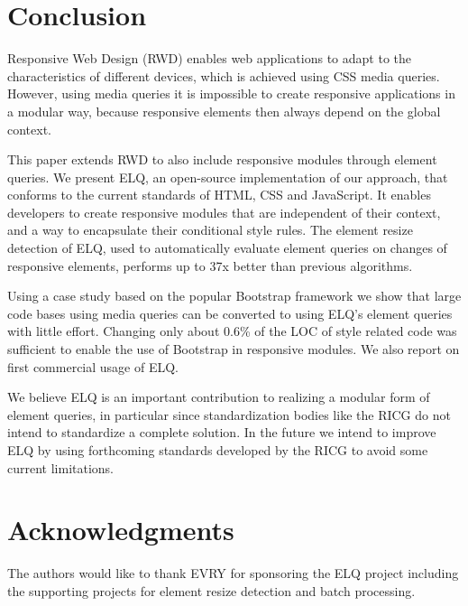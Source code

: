 \documentclass{acm_proc_article-sp}
\newcommand{\elq}{ELQ}
\begin{document}
\section{Conclusion}\label{sec:conclusion}

  Responsive Web Design (RWD) enables web applications to adapt to the characteristics of different devices, which is achieved using CSS media queries.
  However, using media queries it is impossible to create responsive applications in a modular way, because responsive elements then always depend on the global context.

  This paper extends RWD to also include responsive modules through element queries.
  We present \elq{}, an open-source implementation of our approach, that conforms to the current standards of HTML, CSS and JavaScript.
  It enables developers to create responsive modules that are independent of their context, and a way to encapsulate their conditional style rules.
  The element resize detection of \elq{}, used to automatically evaluate element queries on changes of responsive elements, performs up to 37x better than previous algorithms.

  Using a case study based on the popular Bootstrap framework we show that large code bases using media queries can be converted to using \elq{}'s element queries with little effort.
  Changing only about 0.6\% of the LOC of style related code was sufficient to enable the use of Bootstrap in responsive modules.
  We also report on first commercial usage of \elq{}.
  
  We believe \elq{} is an important contribution to realizing a modular form of element queries, in particular since standardization bodies like the RICG do not intend to standardize a complete solution.
  In the future we intend to improve \elq{} by using forthcoming standards developed by the RICG to avoid some current limitations.


\section{Acknowledgments}
The authors would like to thank EVRY for sponsoring the \elq{} project including the supporting projects for element resize detection and batch processing.

%

%
%
\end{document}
